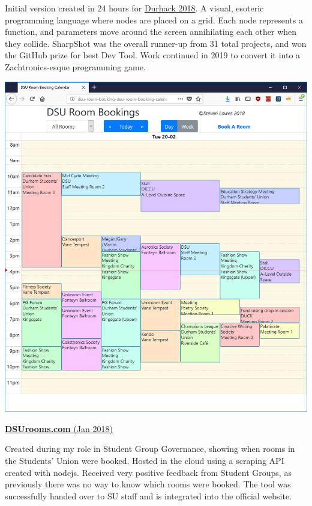 \documentclass[hidelinks, 12pt, a4paper]{article}
\newcommand{\tech}[1]{
	\tcbox[skin=enhanced,nobeforeafter,colframe=black!20,size=fbox,height=15pt]{\footnotesize#1}
}
\begin{document}
\begin{minipage}{0.40\textwidth}
		Initial version created in 24 hours for \href{http://www.durhack.com}{Durhack 2018}. A visual, esoteric programming language where nodes are placed on a grid. Each node represents a function, and parameters move around the screen annihilating each other when they collide. SharpShot was the overall runner-up from 31 total projects, and won the GitHub prize for best Dev Tool. Work continued in 2019 to convert it into a Zachtronics-esque programming game.
		
		\tech{Java} \tech{Kotlin} \tech{Javafx}
		
	\end{minipage}
	\hspace{0.06\textwidth}
	\begin{minipage}{0.40\textwidth}	
		\begin{center}
			\href{http://www.dsurooms.com}{\includegraphics[width=0.9\linewidth]{dsurooms.png}}
		\end{center}
		\href{http://www.dsurooms.com}{\textbf{DSUrooms.com} (Jan 2018)}
		
		Created during my role in Student Group Governance, showing when rooms in the Students' Union were booked. Hosted in the cloud using a scraping API created with nodejs. Received very positive feedback from Student Groups, as previously there was no way to know which rooms were booked. The tool was successfully handed over to SU staff and is integrated into the official website.
		

\end{minipage}
\end{document}

